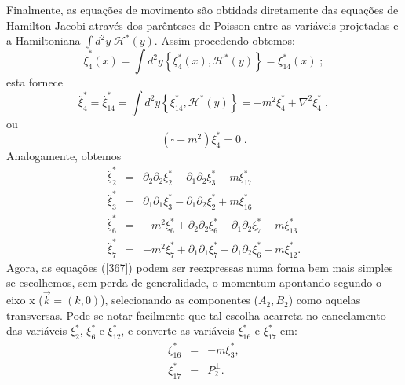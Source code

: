 \documentclass[a4paper,thmsa,12pt]{report}
\begin{document}
Finalmente, as equa\c{c}\~{o}es de movimento s\~{a}o obtidads diretamente
das equa\c{c}\~{o}es de Hamilton-Jacobi atrav\'{e}s dos par\^{e}nteses de
Poisson entre as vari\'{a}veis projetadas e a Hamiltoniana $\int d^{2}y\;%
\mathcal{H}^{\ast }(y)$. Assim procedendo obtemos: 
\begin{equation}
{\stackrel{.}{\xi }}_{4}^{\ast }(x)=\int d^{2}y\left\{ \xi _{4}^{\ast }(x),%
\mathcal{H}^{\ast }(y)\right\} =\xi _{14}^{\ast }(x)\;;  \label{364}
\end{equation}
esta fornece 
\begin{equation}
{\stackrel{..}{\xi }}_{4}^{\ast }={\stackrel{.}{\xi }}_{14}^{\ast }=\int
d^{2}y\left\{ \xi _{14}^{\ast },\mathcal{H}^{\ast }(y)\right\} =-m^{2}\xi
_{4}^{\ast }+\nabla ^{2}\xi _{4}^{\ast }\;,  \label{365}
\end{equation}
ou 
\begin{equation}
(\square +m^{2})\xi _{4}^{\ast }=0\;.  \label{366}
\end{equation}
Analogamente, obtemos 
\begin{eqnarray}
{\stackrel{..}{\xi }}_{2}^{\ast } &=&\partial _{2}\partial _{2}\xi
_{2}^{\ast }-\partial _{1}\partial _{2}\xi _{3}^{\ast }-m\xi _{17}^{\ast } 
\nonumber \\
{\stackrel{..}{\xi }}_{3}^{\ast } &=&\partial _{1}\partial _{1}\xi
_{3}^{\ast }-\partial _{1}\partial _{2}\xi _{2}^{\ast }+m\xi _{16}^{\ast } 
\nonumber \\
{\stackrel{..}{\xi }}_{6}^{\ast } &=&-m^{2}\xi _{6}^{\ast }+\partial
_{2}\partial _{2}\xi _{6}^{\ast }-\partial _{1}\partial _{2}\xi _{7}^{\ast
}-m\xi _{13}^{\ast }  \nonumber \\
{\stackrel{..}{\xi }}_{7}^{\ast } &=&-m^{2}\xi _{7}^{\ast }+\partial
_{1}\partial _{1}\xi _{7}^{\ast }-\partial _{1}\partial _{2}\xi _{6}^{\ast
}+m\xi _{12}^{\ast }.  \label{367}
\end{eqnarray}
Agora, as equa\c{c}\~{o}es (\ref{367}) podem ser reexpressas numa forma bem
mais simples se es\-co\-lhe\-mos, sem perda de generalidade, o momentum apontando
segundo o eixo x ($\vec{k}=(k,0)$), selecionando as componentes ($%
A_{2},B_{2} $) como aquelas transversas. Pode-se notar facilmente que tal
escolha acarreta no cancelamento das vari\'{a}veis $\xi _{2}^{\ast }$, $\xi
_{6}^{\ast }$ e $\xi _{12}^{\ast }$, e converte as vari\'{a}veis $\xi
_{16}^{\ast }$ e $\xi _{17}^{\ast }$ em: 
\begin{eqnarray}
\xi _{16}^{\ast } &=&-m\xi _{3}^{\ast },  \nonumber \\
\xi _{17}^{\ast } &=&P_{2}^{\perp }.  \nonumber
\end{eqnarray}
\end{document}
